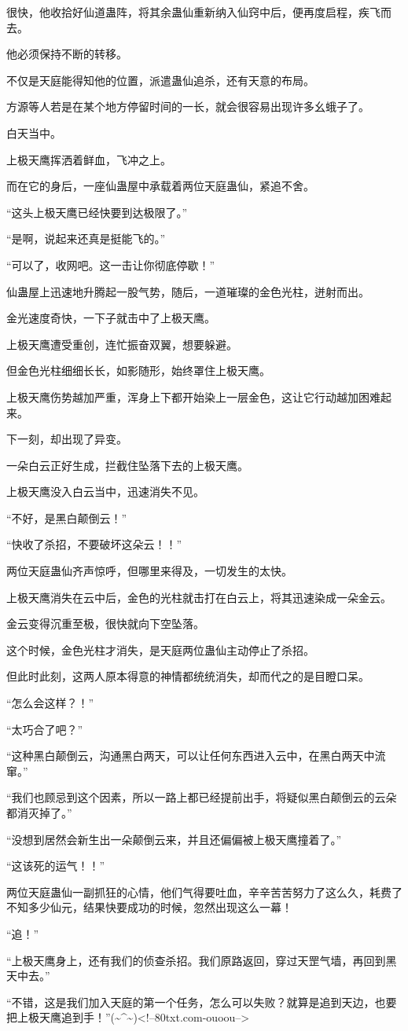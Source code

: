 \begin{this_body}
很快，他收拾好仙道蛊阵，将其余蛊仙重新纳入仙窍中后，便再度启程，疾飞而去。

他必须保持不断的转移。

不仅是天庭能得知他的位置，派遣蛊仙追杀，还有天意的布局。

方源等人若是在某个地方停留时间的一长，就会很容易出现许多幺蛾子了。

白天当中。

上极天鹰挥洒着鲜血，飞冲之上。

而在它的身后，一座仙蛊屋中承载着两位天庭蛊仙，紧追不舍。

“这头上极天鹰已经快要到达极限了。”

“是啊，说起来还真是挺能飞的。”

“可以了，收网吧。这一击让你彻底停歇！”

仙蛊屋上迅速地升腾起一股气势，随后，一道璀璨的金色光柱，迸射而出。

金光速度奇快，一下子就击中了上极天鹰。

上极天鹰遭受重创，连忙振奋双翼，想要躲避。

但金色光柱细细长长，如影随形，始终罩住上极天鹰。

上极天鹰伤势越加严重，浑身上下都开始染上一层金色，这让它行动越加困难起来。

下一刻，却出现了异变。

一朵白云正好生成，拦截住坠落下去的上极天鹰。

上极天鹰没入白云当中，迅速消失不见。

“不好，是黑白颠倒云！”

“快收了杀招，不要破坏这朵云！！”

两位天庭蛊仙齐声惊呼，但哪里来得及，一切发生的太快。

上极天鹰消失在云中后，金色的光柱就击打在白云上，将其迅速染成一朵金云。

金云变得沉重至极，很快就向下空坠落。

这个时候，金色光柱才消失，是天庭两位蛊仙主动停止了杀招。

但此时此刻，这两人原本得意的神情都统统消失，却而代之的是目瞪口呆。

“怎么会这样？！”

“太巧合了吧？”

“这种黑白颠倒云，沟通黑白两天，可以让任何东西进入云中，在黑白两天中流窜。”

“我们也顾忌到这个因素，所以一路上都已经提前出手，将疑似黑白颠倒云的云朵都消灭掉了。”

“没想到居然会新生出一朵颠倒云来，并且还偏偏被上极天鹰撞着了。”

“这该死的运气！！”

两位天庭蛊仙一副抓狂的心情，他们气得要吐血，辛辛苦苦努力了这么久，耗费了不知多少仙元，结果快要成功的时候，忽然出现这么一幕！

“追！”

“上极天鹰身上，还有我们的侦查杀招。我们原路返回，穿过天罡气墙，再回到黑天中去。”

“不错，这是我们加入天庭的第一个任务，怎么可以失败？就算是追到天边，也要把上极天鹰追到手！”(\~{}\^{}\~{})<!--80txt.com-ouoou-->

\end{this_body}

